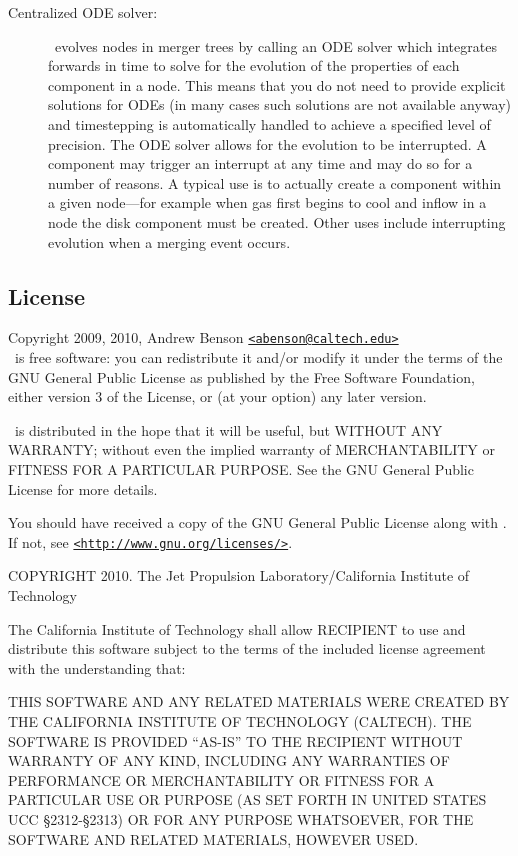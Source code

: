 \begin{description}
 \item [Centralized ODE solver:] \glc\ evolves nodes in merger trees by calling an ODE solver which integrates forwards in time to solve for the evolution of the properties of each component in a node. This means that you do not need to provide explicit solutions for ODEs (in many cases such solutions are not available anyway) and timestepping is automatically handled to achieve a specified level of precision. The ODE solver allows for the evolution to be interrupted. A component may trigger an interrupt at any time and may do so for a number of reasons. A typical use is to actually create a component within a given node---for example when gas first begins to cool and inflow in a node the disk component must be created. Other uses include interrupting evolution when a merging event occurs.
\end{description}

\subsection{License}

Copyright 2009, 2010, Andrew Benson \href{mailto:abenson@caltech.edu}{\tt <abenson@caltech.edu>}\\

\glc\ is free software: you can redistribute it and/or modify
it under the terms of the GNU General Public License as published by
the Free Software Foundation, either version 3 of the License, or
(at your option) any later version.

\glc\ is distributed in the hope that it will be useful,
but WITHOUT ANY WARRANTY; without even the implied warranty of
MERCHANTABILITY or FITNESS FOR A PARTICULAR PURPOSE.  See the
GNU General Public License for more details.

You should have received a copy of the GNU General Public License
along with \glc.  If not, see \href{http://www.gnu.org/licenses/}{\tt <http://www.gnu.org/licenses/>}.


COPYRIGHT 2010. The Jet Propulsion Laboratory/California Institute of Technology

The California Institute of Technology shall allow RECIPIENT to use and
distribute this software subject to the terms of the included license
agreement with the understanding that:

THIS SOFTWARE AND ANY RELATED MATERIALS WERE CREATED BY THE CALIFORNIA
INSTITUTE OF TECHNOLOGY (CALTECH). THE SOFTWARE IS PROVIDED ``AS-IS'' TO
THE RECIPIENT WITHOUT WARRANTY OF ANY KIND, INCLUDING ANY WARRANTIES OF
PERFORMANCE OR MERCHANTABILITY OR FITNESS FOR A PARTICULAR USE OR
PURPOSE (AS SET FORTH IN UNITED STATES UCC \S2312-\S2313) OR FOR ANY
PURPOSE WHATSOEVER, FOR THE SOFTWARE AND RELATED MATERIALS, HOWEVER
USED.

